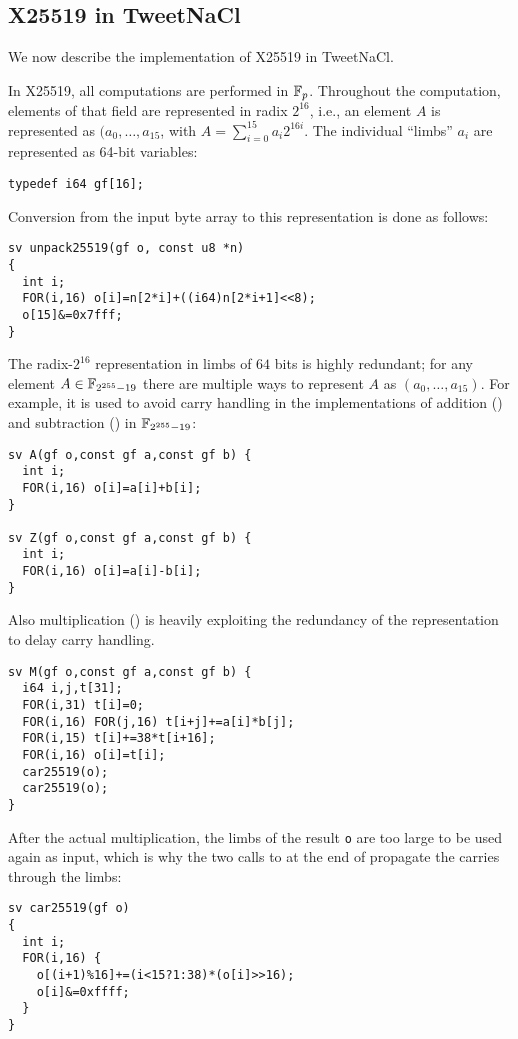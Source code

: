 \subsection{X25519 in TweetNaCl}
\label{preliminaries:B}

We now describe the implementation of X25519 in TweetNaCl.

In X25519, all computations are performed in $\mathbb{F}_{p}$.
Throughout the computation, elements of that field
are represented in radix $2^{16}$,
i.e., an element $A$ is represented as $(a_0,\dots,a_{15}$,
with $A = \sum_{i=0}^{15}a_i2^{16i}$.
The individual ``limbs'' $a_i$ are represented as
64-bit  variables:
\begin{lstlisting}[language=Ctweetnacl]
typedef i64 gf[16];
\end{lstlisting}

Conversion from the input byte array to this representation is done
as follows:
\begin{lstlisting}[language=Ctweetnacl]
sv unpack25519(gf o, const u8 *n)
{
  int i;
  FOR(i,16) o[i]=n[2*i]+((i64)n[2*i+1]<<8);
  o[15]&=0x7fff;
}
\end{lstlisting}

The radix-$2^{16}$ representation in limbs of $64$ bits is
highly redundant; for any element $A \in \mathbb{F}_{2^{255}-19}$ there are
multiple ways to represent $A$ as $(a_0,\dots,a_{15})$.
For example, it is used to avoid carry handling in
the implementations of addition ()
and subtraction () in $\mathbb{F}_{2^{255}-19}$:
\begin{lstlisting}[language=Ctweetnacl]
sv A(gf o,const gf a,const gf b) {
  int i;
  FOR(i,16) o[i]=a[i]+b[i];
}

sv Z(gf o,const gf a,const gf b) {
  int i;
  FOR(i,16) o[i]=a[i]-b[i];
}
\end{lstlisting}

Also multiplication () is heavily exploiting the redundancy
of the representation to delay carry handling.
\begin{lstlisting}[language=Ctweetnacl]
sv M(gf o,const gf a,const gf b) {
  i64 i,j,t[31];
  FOR(i,31) t[i]=0;
  FOR(i,16) FOR(j,16) t[i+j]+=a[i]*b[j];
  FOR(i,15) t[i]+=38*t[i+16];
  FOR(i,16) o[i]=t[i];
  car25519(o);
  car25519(o);
}
\end{lstlisting}

After the actual multiplication, the limbs of the result \texttt{o} are
too large to be used again as input, which is why the two calls to
 at the end of  propagate the carries through the limbs:
\begin{lstlisting}[language=Ctweetnacl]
sv car25519(gf o)
{
  int i;
  FOR(i,16) {
    o[(i+1)%16]+=(i<15?1:38)*(o[i]>>16);
    o[i]&=0xffff;
  }
}
\end{lstlisting}

